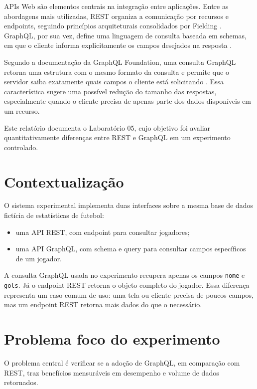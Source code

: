 \documentclass[12pt,a4paper]{article}
\begin{document}
APIs Web são elementos centrais na integração entre aplicações. Entre as abordagens mais utilizadas, REST organiza a comunicação por recursos e endpoints, seguindo princípios arquiteturais consolidados por Fielding \cite{fielding2000rest}. GraphQL, por sua vez, define uma linguagem de consulta baseada em schemas, em que o cliente informa explicitamente os campos desejados na resposta \cite{graphqlspec2025}.

Segundo a documentação da GraphQL Foundation, uma consulta GraphQL retorna uma estrutura com o mesmo formato da consulta e permite que o servidor saiba exatamente quais campos o cliente está solicitando \cite{graphqlqueries2026}. Essa característica sugere uma possível redução do tamanho das respostas, especialmente quando o cliente precisa de apenas parte dos dados disponíveis em um recurso.

Este relatório documenta o Laboratório 05, cujo objetivo foi avaliar quantitativamente diferenças entre REST e GraphQL em um experimento controlado.

\section{Contextualização}

O sistema experimental implementa duas interfaces sobre a mesma base de dados fictícia de estatísticas de futebol:

\begin{itemize}
  \item uma API REST, com endpoint para consultar jogadores;
  \item uma API GraphQL, com schema e query para consultar campos específicos de um jogador.
\end{itemize}

A consulta GraphQL usada no experimento recupera apenas os campos \texttt{nome} e \texttt{gols}. Já o endpoint REST retorna o objeto completo do jogador. Essa diferença representa um caso comum de uso: uma tela ou cliente precisa de poucos campos, mas um endpoint REST retorna mais dados do que o necessário.

\section{Problema foco do experimento}

O problema central é verificar se a adoção de GraphQL, em comparação com REST, traz benefícios mensuráveis em desempenho e volume de dados retornados.
\end{document}
